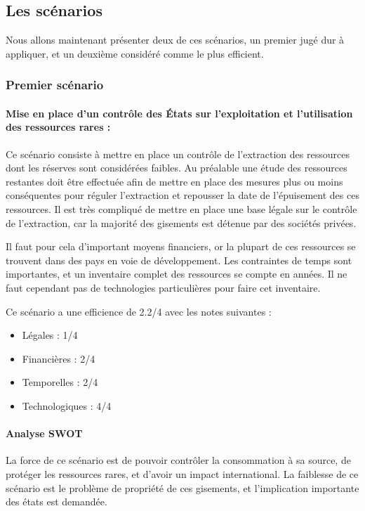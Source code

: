 \subsection{Les scénarios}

\smallbreak Nous allons maintenant présenter deux de ces scénarios, un premier jugé dur à appliquer, et un deuxième considéré comme le plus efficient.

\subsubsection{Premier scénario}    

\paragraph{Mise en place d’un contrôle des États sur l’exploitation et l’utilisation des ressources rares :}
\medbreak
Ce scénario consiste à mettre en place un contrôle de l’extraction des ressources dont les réserves sont considérées faibles. Au préalable une étude des ressources restantes doit être effectuée afin de mettre en place des mesures plus ou moins conséquentes pour réguler l’extraction et repousser la date de l’épuisement des ces ressources.
Il est très compliqué de mettre en place une base légale sur le contrôle de l’extraction, car la majorité des gisements est détenue par des sociétés privées. 

Il faut pour cela d’important moyens financiers, or la plupart de ces ressources se trouvent dans des pays en voie de développement.
Les contraintes de temps sont importantes, et un inventaire complet des ressources se compte en années. 
Il ne faut cependant pas de technologies particulières pour faire cet inventaire.

Ce scénario a une efficience de 2.2/4 avec les notes suivantes :
\begin{itemize}
\item Légales : 1/4
\item Financières : 2/4
\item Temporelles : 2/4
\item Technologiques : 4/4
\end{itemize}


\paragraph{Analyse SWOT}

La force de ce scénario est de pouvoir contrôler la consommation à sa source, de protéger les ressources rares, et d’avoir un impact international.
La faiblesse de ce scénario est le problème de propriété de ces gisements, et l’implication importante des états est demandée. 

